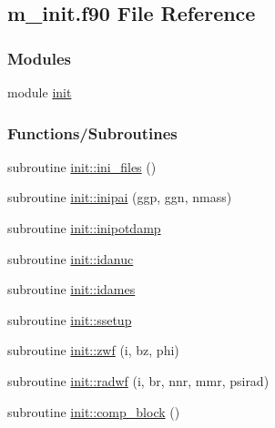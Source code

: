 \hypertarget{m__init_8f90}{}\subsection{m\+\_\+init.\+f90 File Reference}
\label{m__init_8f90}
\subsubsection*{Modules}
\begin{DoxyCompactItemize}
\item 
module \hyperlink{namespaceinit}{init}
\end{DoxyCompactItemize}
\subsubsection*{Functions/\+Subroutines}
\begin{DoxyCompactItemize}
\item 
subroutine \hyperlink{namespaceinit_a5db0d7daba98172224f91108753a3af8}{init\+::ini\+\_\+files} ()
\item 
subroutine \hyperlink{namespaceinit_a3c9b99fc0c177ed0e143f1ad563a5954}{init\+::inipai} (ggp, ggn, nmass)
\item 
subroutine \hyperlink{namespaceinit_ae2de71e7c9f82e3318b17abc5f26d66b}{init\+::inipotdamp}
\item 
subroutine \hyperlink{namespaceinit_a95117d43c89bb76168c354dd25f50a43}{init\+::idanuc}
\item 
subroutine \hyperlink{namespaceinit_ad50885656fa6885c70e4081da12223f9}{init\+::idames}
\item 
subroutine \hyperlink{namespaceinit_a6bd3ec665d98222e5c2a4edb87dbbba7}{init\+::ssetup}
\item 
subroutine \hyperlink{namespaceinit_af4cff2997a0fa89f928781b88f041c25}{init\+::zwf} (i, bz, phi)
\item 
subroutine \hyperlink{namespaceinit_ab1d5ba41a79e9716f93254a6922eba49}{init\+::radwf} (i, br, nnr, mmr, psirad)
\item 
subroutine \hyperlink{namespaceinit_a4eecaf4c1f26053d2c652a5f6f76c036}{init\+::comp\+\_\+block} ()
\end{DoxyCompactItemize}
